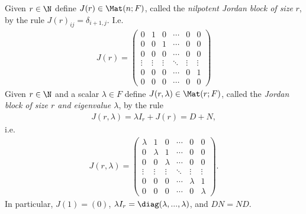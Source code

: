\documentclass{article}
\begin{document}
\begin{definition}
	Given $r\in\N$ define $J(r)\in\Mat(n;F)$, called the \emph{nilpotent Jordan block of
		size} $r$, by the rule $J(r)_{ij}=\delta_{i+1,j}$. I.e.
	\begin{align*}
		J(r) = \begin{pmatrix}
			       0      & 1      & 0      & \cdots & 0      & 0      \\
			       0      & 0      & 1      & \cdots & 0      & 0      \\
			       0      & 0      & 0      & \cdots & 0      & 0      \\
			       \vdots & \vdots & \vdots & \ddots & \vdots & \vdots \\
			       0      & 0      & 0      & \cdots & 0      & 1      \\
			       0      & 0      & 0      & \cdots & 0      & 0
		       \end{pmatrix}
	\end{align*}
	Given $r\in\N$ and a scalar $\lambda\in F$ define $J(r,\lambda)\in\Mat(r; F)$, called the
	\emph{Jordan block of size $r$ and eigenvalue $\lambda$}, by the rule
	\begin{align*}
		J(r,\lambda)=\lambda I_r + J(r) = D + N,
	\end{align*}
	i.e.
	\begin{align*}
		J(r,\lambda) = \begin{pmatrix}
			               \lambda & 1       & 0       & \cdots & 0       & 0       \\
			               0       & \lambda & 1       & \cdots & 0       & 0       \\
			               0       & 0       & \lambda & \cdots & 0       & 0       \\
			               \vdots  & \vdots  & \vdots  & \ddots & \vdots  & \vdots  \\
			               0       & 0       & 0       & \cdots & \lambda & 1       \\
			               0       & 0       & 0       & \cdots & 0       & \lambda
		               \end{pmatrix}.
	\end{align*}
	In particular, $J(1)=(0)$, $\lambda I_r=\diag(\lambda, ..., \lambda)$, and $DN=ND$.
\end{definition}
\end{document}
